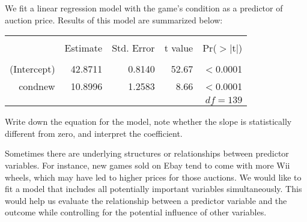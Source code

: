 \D{\newpage}

\begin{exercisewrap}
\begin{nexercise}
\label{condNewVarForMarioKartOnly}
We fit a linear regression model with
the game's condition as a predictor of auction price.
Results of this model are summarized below:
\begin{center}
\begin{tabular}{rrrrr}
  \hline
  \vspace{-3.7mm} & & & & \\
 & Estimate & Std. Error & t value & Pr($>$$|$t$|$) \\ 
  \hline
  \vspace{-3.8mm} & & & & \\
(Intercept) & 42.8711 & 0.8140 & 52.67 & $<$0.0001 \\ 
  cond\us{}new & 10.8996 & 1.2583 & 8.66 & $<$0.0001 \\ 
   \hline
   &&&\multicolumn{2}{r}{$df=139$}
\end{tabular}
\end{center}
Write down the equation for the model,
note whether the slope is statistically different from zero,
and interpret the coefficient.\footnotemark{}
\end{nexercise}
\end{exercisewrap}

Sometimes there are underlying structures or relationships between predictor variables. For instance, new games sold on Ebay tend to come with more Wii wheels, which may have led to higher prices for those auctions. We would like to fit a model that includes all potentially important variables simultaneously. This would help us evaluate the relationship between a predictor variable and the outcome while controlling for the potential influence of other variables.

